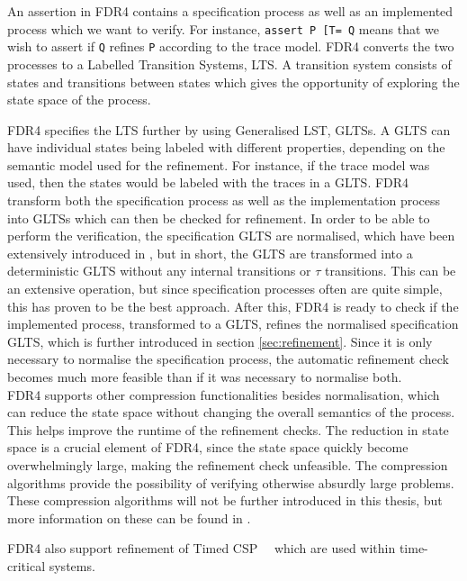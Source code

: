 An assertion in FDR4 contains a specification process as well as an implemented process which we want to verify. For instance, \texttt{assert P [T= Q} means that we wish to assert if \texttt{Q} refines \texttt{P} according to the trace model.
FDR4 converts the two processes to a Labelled Transition Systems, LTS. A transition system consists of states and transitions between states which gives the opportunity of exploring the state space of the process.

FDR4 specifies the LTS further by using Generalised LST, GLTSs. A GLTS can have individual states being labeled with different properties, depending on the semantic model used for the refinement. For instance, if the trace model was used, then the states would be labeled with the traces in a GLTS.
FDR4 transform both the specification process as well as the implementation process into GLTSs which can then be checked for refinement. In order to be able to perform the verification, the specification GLTS are normalised, which have been extensively introduced in \cite{Roscoe1997}, but in short, the GLTS are transformed into a deterministic GLTS without any internal transitions or $\tau$ transitions. This can be an extensive operation, but since specification processes often are quite simple, this has proven to be the best approach.
After this, FDR4 is ready to check if the implemented process, transformed to a GLTS, refines the normalised specification GLTS, which is further introduced in section \ref{sec:refinement}. Since it is only necessary to normalise the specification process, the automatic refinement check becomes much more feasible than if it was necessary to normalise both. \\

FDR4 supports other compression functionalities besides normalisation, which can reduce the state space without changing the overall semantics of the process. This helps improve the runtime of the refinement checks. The reduction in state space is a crucial element of FDR4, since the state space quickly become overwhelmingly large, making the refinement check unfeasible. The compression algorithms provide the possibility of verifying otherwise absurdly large problems.
These compression algorithms will not be further introduced in this thesis, but more information on these can be found in \cite{Roscoe2010}.

FDR4 also support refinement of Timed CSP~\cite{REED1988249}~\cite{Armstrong2011} which are used within time-critical systems. \\

